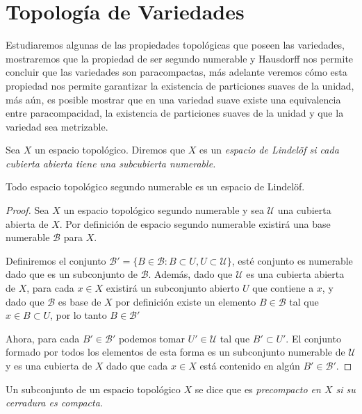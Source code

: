 \appendix
\chapter{Topología de Variedades}\label{Anexo: Topologia De Variedades}
Estudiaremos algunas de las propiedades topológicas que poseen las variedades, mostraremos que la propiedad de ser segundo numerable y Hausdorff nos permite concluir que las variedades son paracompactas, más adelante veremos cómo esta propiedad nos permite garantizar la existencia de particiones suaves de la unidad, más aún, es posible mostrar que en una variedad suave existe una equivalencia entre paracompacidad, la existencia de particiones suaves de la unidad y que la variedad sea metrizable.

\begin{definition}\label{Definición: Lindelöf}
  Sea $X$ un espacio topológico. Diremos que $X$ es un \it{espacio de Lindelöf} si cada cubierta abierta tiene una subcubierta numerable.
\end{definition}

\begin{theorem}
  Todo espacio topológico segundo numerable es un espacio de Lindelöf.
\end{theorem}

\begin{proof}
  Sea $X$ un espacio topológico segundo numerable y sea $\mathcal{U}$ una cubierta abierta de $X$. Por definición de espacio segundo numerable existirá una base numerable $\mathcal{B}$ para $X$.

  Definiremos el conjunto $\mathcal{B}' = \{B \in \mathcal{B} : B \subset U, U \subset \mathcal{U}\}$, esté conjunto es numerable dado que es un subconjunto de $\mathcal{B}$. Además, dado que $\mathcal{U}$ es una cubierta abierta de $X$, para cada $x \in X$ existirá un subconjunto abierto $U$ que contiene a $x$, y dado que $\mathcal{B}$ es base de $X$ por definición existe un elemento $B \in \mathcal{B}$ tal que $x \in B \subset U$, por lo tanto $B \in \mathcal{B}'$

  Ahora, para cada $B' \in \mathcal{B}'$ podemos tomar $U' \in \mathcal{U}$ tal que $B' \subset U'$. El conjunto formado por todos los elementos de esta forma es un subconjunto numerable de $\mathcal{U}$ y es una cubierta de $X$ dado que cada $x \in X$ está contenido en algún $B' \in \mathcal{B}'$.
\end{proof}

\begin{definition}\label{Definición: Subconjunto Precompacto}
  Un subconjunto de un espacio topológico $X$ se dice que es \it{precompacto} en $X$ si su cerradura es compacta. 
\end{definition} 


